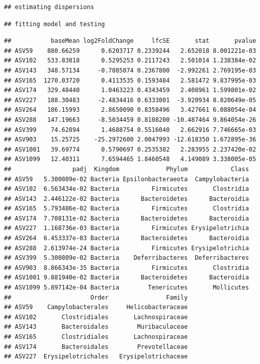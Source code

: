 \documentclass[]{article}
\begin{document}
\begin{verbatim}
## estimating dispersions
\end{verbatim}

\begin{verbatim}
## fitting model and testing
\end{verbatim}

\begin{verbatim}
##           baseMean log2FoldChange     lfcSE       stat       pvalue
## ASV59    880.66259      0.6203717 0.2339244   2.652018 8.001221e-03
## ASV102   533.83818      0.5295253 0.2117243   2.501014 1.238384e-02
## ASV143   348.57134     -0.7085074 0.2367800  -2.992261 2.769195e-03
## ASV165  1270.03720      0.4113535 0.1593484   2.581472 9.837995e-03
## ASV174   329.48440      1.0463223 0.4343459   2.408961 1.599801e-02
## ASV227   188.30483     -2.4834416 0.6333801  -3.920934 8.820649e-05
## ASV264   186.15993      2.8650090 0.8358496   3.427661 6.088054e-04
## ASV288   147.19663     -8.5034459 0.8108200 -10.487464 9.864054e-26
## ASV399    74.62894      1.4688754 0.5516040   2.662916 7.746665e-03
## ASV903    15.25725    -25.2972600 2.0047993 -12.618350 1.672895e-36
## ASV1001   39.69774      0.5790697 0.2535382   2.283955 2.237420e-02
## ASV1099   12.40311      7.6594465 1.8460548   4.149089 3.338005e-05
##                 padj  Kingdom             Phylum            Class
## ASV59   5.300809e-02 Bacteria Epsilonbacteraeota  Campylobacteria
## ASV102  6.563434e-02 Bacteria         Firmicutes       Clostridia
## ASV143  2.446122e-02 Bacteria      Bacteroidetes      Bacteroidia
## ASV165  5.793486e-02 Bacteria         Firmicutes       Clostridia
## ASV174  7.708131e-02 Bacteria      Bacteroidetes      Bacteroidia
## ASV227  1.168736e-03 Bacteria         Firmicutes Erysipelotrichia
## ASV264  6.453337e-03 Bacteria      Bacteroidetes      Bacteroidia
## ASV288  2.613974e-24 Bacteria         Firmicutes Erysipelotrichia
## ASV399  5.300809e-02 Bacteria    Deferribacteres  Deferribacteres
## ASV903  8.866343e-35 Bacteria         Firmicutes       Clostridia
## ASV1001 9.881940e-02 Bacteria      Bacteroidetes      Bacteroidia
## ASV1099 5.897142e-04 Bacteria        Tenericutes       Mollicutes
##                      Order                Family
## ASV59    Campylobacterales     Helicobacteraceae
## ASV102       Clostridiales       Lachnospiraceae
## ASV143       Bacteroidales        Muribaculaceae
## ASV165       Clostridiales       Lachnospiraceae
## ASV174       Bacteroidales        Prevotellaceae
## ASV227  Erysipelotrichales   Erysipelotrichaceae

\end{verbatim}
\end{document}
